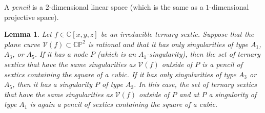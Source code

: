 \documentclass[a4paper]{article}
\numberwithin{equation}{section}
\newcommand{\C}{\mathbb{C}}
\renewcommand{\P}{\mathbb{P}}
\newcommand{\V}{\mathcal{V}}
\newtheorem{lemma}[theorem]{Lemma}
\theoremstyle{definition}
\theoremstyle{remark}
\begin{document}
A \emph{pencil} is a $2$-dimensional linear space (which is the same as a $1$-dimensional projective space).
\begin{lemma}\label{lem:resolutionssing}
Let $f\in \C[x,y,z]$ be an irreducible ternary sextic. Suppose that the plane curve $\V(f)\subset \C\P^2$ is rational and that it has only singularities of type $A_1$, $A_3$, or $A_5$.
If it has a node $P$ (which is an $A_1$-singularity), then the set of ternary sextics that have the same singularities as $\V(f)$ outside of $P$ is a pencil of sextics containing the square of a cubic.
If it has only singularities of type $A_3$ or $A_5$, then it has a singularity $P$ of type $A_3$. In this case, the set of ternary sextics that have the same singularities as $\V(f)$ outside of $P$ and at $P$ a singularity of type $A_1$ is again a pencil of sextics containing the square of a cubic.
\end{lemma}
\end{document}
